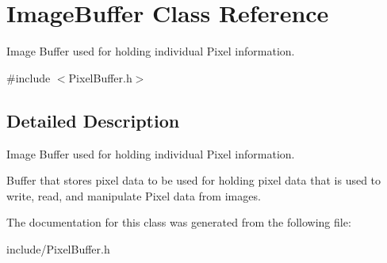 \hypertarget{classImageBuffer}{}\section{Image\+Buffer Class Reference}
\label{classImageBuffer}


Image Buffer used for holding individual Pixel information.  




{\ttfamily \#include $<$Pixel\+Buffer.\+h$>$}



\subsection{Detailed Description}
Image Buffer used for holding individual Pixel information. 

Buffer that stores pixel data to be used for holding pixel data that is used to write, read, and manipulate Pixel data from images. 

The documentation for this class was generated from the following file\+:\begin{DoxyCompactItemize}
\item 
include/Pixel\+Buffer.\+h\end{DoxyCompactItemize}
